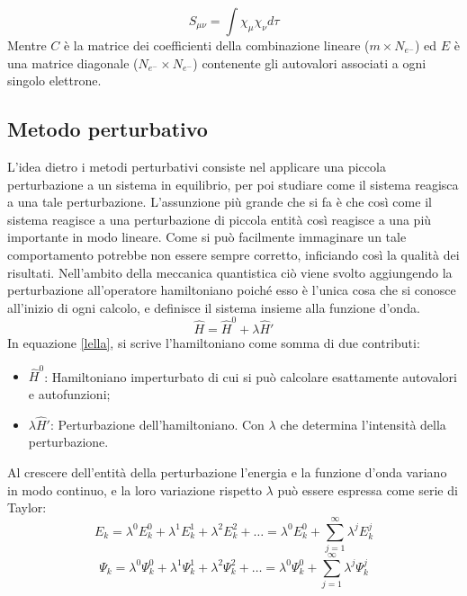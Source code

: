 \documentclass[oneside]{amsbook}
\numberwithin{section}{chapter}
\numberwithin{equation}{section}
\numberwithin{figure}{section}
\begin{document}
\begin{equation}
S_{\mu \nu}=\int \chi_{\mu}\chi_{\nu} d\tau
\end{equation}
Mentre $C$ è la matrice dei coefficienti della combinazione lineare ($m\times N_{e^-}$) ed $E$ è una matrice diagonale ($N_{e^-}\times N_{e^-}$) contenente gli autovalori associati a ogni singolo elettrone.

\subsection{Metodo perturbativo}
L'idea dietro i metodi perturbativi  consiste nel applicare una piccola perturbazione a un sistema in equilibrio, per poi studiare come il sistema reagisca a una tale perturbazione. L'assunzione più grande che si fa è che così come il sistema reagisce a una perturbazione di piccola entità così reagisce a una più importante in modo lineare. Come si può facilmente immaginare un tale comportamento potrebbe non essere sempre corretto, inficiando così la qualità dei risultati.
Nell'ambito della meccanica quantistica ciò viene svolto aggiungendo la perturbazione all'operatore hamiltoniano poiché esso è l'unica cosa che si conosce all'inizio di ogni calcolo, e definisce il sistema insieme alla funzione d'onda.
\begin{equation}
\label{lella}
\hat{H}=\hat{H}^0+\lambda\hat{H}'
\end{equation}
In equazione \ref{lella}, si scrive l'hamiltoniano come somma di due contributi:
\begin{itemize}
\item $\hat{H}^0$: Hamiltoniano imperturbato di cui si può calcolare esattamente autovalori e autofunzioni;
\item $\lambda\hat{H}'$: Perturbazione dell'hamiltoniano. Con $\lambda$ che determina l'intensità della perturbazione.
\end{itemize}
Al crescere dell'entità della perturbazione l'energia e la funzione d'onda variano in modo continuo, e la loro variazione rispetto $\lambda$ può essere espressa come serie di Taylor:
\begin{equation}
E_k=\lambda^0E_k^0+\lambda^1E_k^1+\lambda^2E_k^2+\ldots=\lambda^0E_k^0+\sum \limits
_{j=1}^{\infty} \lambda^jE_k^j
\end{equation}
\begin{equation}
\Psi_k=\lambda^0\Psi_k^0+\lambda^1\Psi_k^1+\lambda^2\Psi_k^2+\ldots=\lambda^0\Psi_k^0+\sum \limits
_{j=1}^{\infty} \lambda^j\Psi_k^j
\end{equation}
\end{document}
